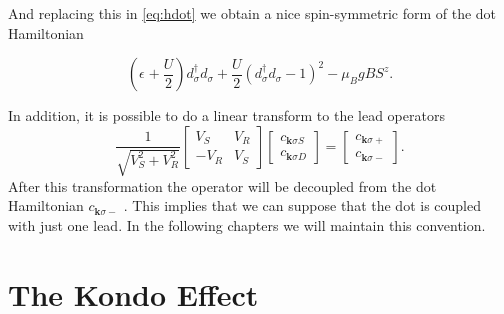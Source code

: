 \noindent And replacing this in \eqref{eq:hdot} we obtain a  nice spin-symmetric form of the dot Hamiltonian

\begin{equation}
    \left(\epsilon_{}+\frac{U}{2}\right)d_{\sigma}^{\dagger}d_{\sigma}+\frac{U}{2}(d_{\sigma}^{\dagger}d_{\sigma}-1)^{2}-\mu_{B}gBS^{z}. 
    \label{eq:hdot2}
\end{equation}

In addition, it is possible to do a linear transform to the lead operators 
\begin{equation}
    \frac{1}{\sqrt{V_{S}^{2}+V_{R}^{2}}}\left[\begin{array}{cc}
V_{S} & V_{R}\\
-V_{R} & V_{S}
\end{array}\right]\left[\begin{array}{c}
c_{\mathbf{k}\sigma S}\\
c_{\mathbf{k}\sigma D}
\end{array}\right]=\left[\begin{array}{c}
c_{\mathbf{k}\sigma+}\\
c_{\mathbf{k}\sigma-}
\end{array}\right].
\end{equation}
\noindent After this transformation the operator will be decoupled from the dot Hamiltonian $c_{\mathbf{k}\sigma-}$ . This implies that we can suppose that the  dot is coupled with just one lead. In the following chapters we will maintain this convention. 


\section{The Kondo Effect \label{sec:Kondo} }


